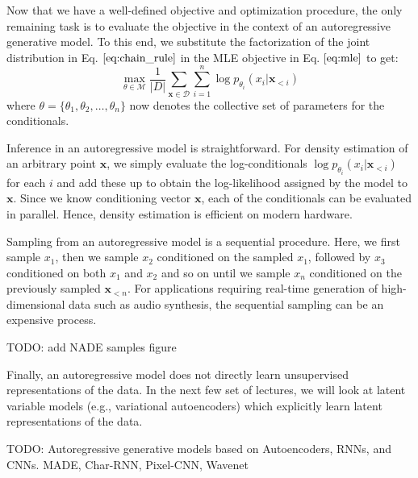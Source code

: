 Now that we have a well-defined objective and optimization procedure, the only remaining task is to evaluate the objective in the context of an autoregressive generative model. To this end, we substitute the factorization of the joint distribution in Eq.$~\ref{eq:chain_rule}$
in the MLE objective in Eq.$~\ref{eq:mle}$ to get:
\[
\max_{\theta \in \mathcal{M}}\frac{1}{\vert D \vert} \sum_{\mathbf{x} \in\mathcal{D} }\sum_{i=1}^n\log p_{\theta_i}(x_i \vert \mathbf{x}_{<i})
\]where $\theta = \{\theta_1, \theta_2, \ldots, \theta_n\}$ now denotes the collective set of parameters for the conditionals.

Inference in an autoregressive model is straightforward. For density estimation of an arbitrary point $\mathbf{x}$, we simply evaluate the log-conditionals $\log p_{\theta_i}(x_i \vert \mathbf{x}_{<i})$ for each $i$ and add these up to obtain the log-likelihood assigned by the model to $\mathbf{x}$. Since we know conditioning vector $\mathbf{x}$, each of the conditionals can be evaluated in parallel. Hence, density estimation is efficient on modern hardware.

Sampling from an autoregressive model is a sequential procedure. Here, we first sample $x_1$, then we sample $x_2$ conditioned on the sampled $x_1$, followed by $x_3$ conditioned on both $x_1$ and $x_2$ and so on until we sample $x_n$ conditioned on the previously sampled $\mathbf{x}_{<n}$. For applications requiring real-time generation of high-dimensional data such as audio synthesis, the sequential sampling can be an expensive process.


TODO: add NADE samples figure

Finally, an autoregressive model does not directly learn unsupervised representations of the data. In the next few set of lectures, we will look at latent variable models (e.g., variational autoencoders) which explicitly learn latent representations of the data.


TODO: Autoregressive generative models based on Autoencoders, RNNs, and CNNs.
MADE, Char-RNN, Pixel-CNN, Wavenet